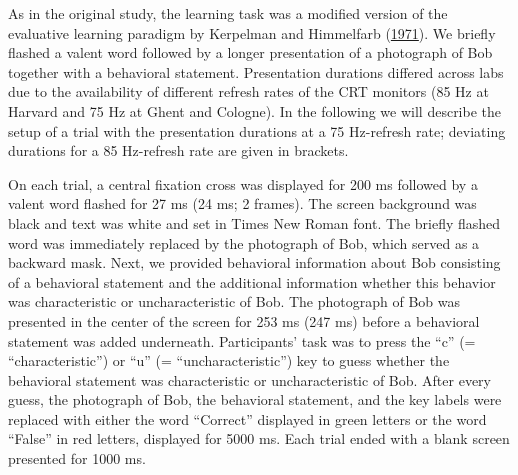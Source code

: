 \documentclass[
  man,floatsintext]{apa6}
\begin{document}
As in the original study, the learning task was a modified version of the evaluative learning paradigm by Kerpelman and Himmelfarb (\protect\hyperlink{ref-kerpelmanPartialReinforcementEffects1971}{1971}).
We briefly flashed a valent word followed by a longer presentation of a photograph of Bob together with a behavioral statement.
Presentation durations differed across labs due to the availability of different refresh rates of the CRT monitors (85 Hz at Harvard and 75 Hz at Ghent and Cologne).
In the following we will describe the setup of a trial with the presentation durations at a 75 Hz-refresh rate; deviating durations for a 85 Hz-refresh rate are given in brackets.

On each trial, a central fixation cross was displayed for 200 ms followed by a valent word flashed for 27 ms (24 ms; 2 frames).
The screen background was black and text was white and set in Times New Roman font.
The briefly flashed word was immediately replaced by the photograph of Bob, which served as a backward mask.
Next, we provided behavioral information about Bob consisting of a behavioral statement and the additional information whether this behavior was characteristic or uncharacteristic of Bob.
The photograph of Bob was presented in the center of the screen for 253 ms (247 ms) before a behavioral statement was added underneath.
Participants' task was to press the ``c'' (= ``characteristic'') or ``u'' (= ``uncharacteristic'') key to guess whether the behavioral statement was characteristic or uncharacteristic of Bob.
After every guess, the photograph of Bob, the behavioral statement, and the key labels were replaced with either the word ``Correct'' displayed in green letters or the word ``False'' in red letters, displayed for 5000 ms.
Each trial ended with a blank screen presented for 1000 ms.
\end{document}
